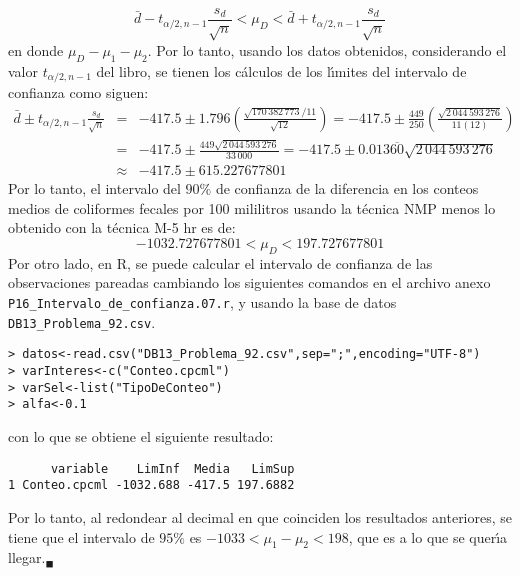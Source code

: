 \begin{solucion}
 \begin{equation*}
  \bar{d} - t_{\alpha/2,n-1}\frac{s_d}{\sqrt{n}} < \mu_D < \bar{d} + t_{\alpha/2,n-1}\frac{s_d}{\sqrt{n}}
 \end{equation*}
 en donde $\mu_D - \mu_1 - \mu_2$. Por lo tanto, usando los datos obtenidos, considerando el valor $t_{\alpha/2,n-1}$ del libro, se tienen los c\'alculos de los l\'{\i}mites del intervalo de confianza como siguen:
 \begin{eqnarray*}
  \bar{d} \pm t_{\alpha/2,n-1}\frac{s_d}{\sqrt{n}} & = & -417.5 \pm 1.796 \left( \frac{\sqrt{170\,382\,773}/11}{\sqrt{12}} \right) = -417.5 \pm \frac{449}{250} \left( \frac{\sqrt{2\,044\,593\,276}}{11(12)} \right) \\
  & = & -417.5 \pm \frac{449\sqrt{2\,044\,593\,276}}{33\,000} = -417.5 \pm 0.013\overline{60}\sqrt{2\,044\,593\,276} \\
  & \approx & -417.5 \pm 615.227677801
 \end{eqnarray*}
 Por lo tanto, el intervalo del $90\%$ de confianza de la diferencia en los conteos medios de coliformes fecales por 100 mililitros usando la t\'ecnica NMP menos lo obtenido con la t\'ecnica M-5 hr es de:
 \begin{equation*}
  -1032.727677801 < \mu_D < 197.727677801
 \end{equation*}
 Por otro lado, en R, se puede calcular el intervalo de confianza de las observaciones pareadas cambiando los siguientes comandos en el archivo anexo \texttt{P16\_Intervalo\_de\_confianza.07.r}, y usando la base de datos \texttt{DB13\_Problema\_92.csv}.
 \begin{verbatim}
> datos<-read.csv("DB13_Problema_92.csv",sep=";",encoding="UTF-8")
> varInteres<-c("Conteo.cpcml")
> varSel<-list("TipoDeConteo")
> alfa<-0.1
 \end{verbatim}
 \vspace{-0.5cm}
 con lo que se obtiene el siguiente resultado:
 \begin{verbatim}
      variable    LimInf  Media   LimSup
1 Conteo.cpcml -1032.688 -417.5 197.6882
 \end{verbatim}
 \vspace{-0.5cm}
 Por lo tanto, al redondear al decimal en que coinciden los resultados anteriores, se tiene que el intervalo de $95\%$ es $-1033 < \mu_1 - \mu_2 < 198$, que es a lo que se quer\'{\i}a llegar.${}_{\blacksquare}$
\end{solucion}
